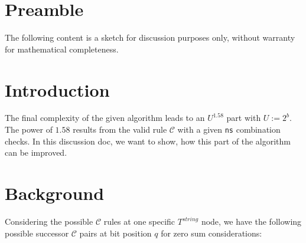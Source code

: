 \documentclass{article}
\newtheorem*{theorem A}{Theorem A}
\newtheorem*{theorem B}{N\"olker's Theorem}
\theoremstyle{remark}
\theoremstyle{remark}
\begin{document}
\section*{Preamble}
\label{s:preamble}
The following content is a sketch for discussion purposes only, without warranty for mathematical completeness.
\section{Introduction}
\label{s:introduction}
The final complexity of the given algorithm leads to an $U^{1.58}$ part with $U := 2^{b}$. The power of $1.58$ results from the valid rule $\mathcal{C}$ with a given \texttt{ns} combination checks. In this discussion doc, we want to show, how this part of the algorithm can be improved.
\section{Background}
\label{s:background}
Considering the possible $\mathcal{C}$ rules at one specific $T^{string}$ node, we have the following possible successor $\mathcal{C}$ pairs at bit position $q$ for zero sum considerations:
\end{document}
